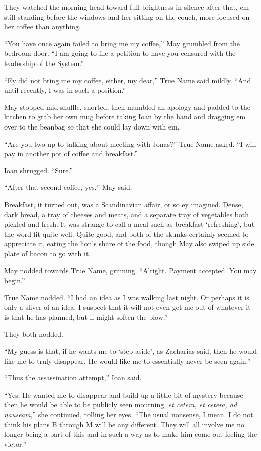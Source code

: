 They watched the morning head toward full brightness in silence after that, em still standing before the windows and her sitting on the couch, more focused on her coffee than anything.

``You have once again failed to bring me my coffee,'' May grumbled from the bedroom door. ``I am going to file a petition to have you censured with the leadership of the System.''

``Ey did not bring me my coffee, either, my dear,'' True Name said mildly. ``And until recently, I was in such a position.''

May stopped mid-shuffle, snorted, then mumbled an apology and padded to the kitchen to grab her own mug before taking Ioan by the hand and dragging em over to the beanbag so that she could lay down with em.

``Are you two up to talking about meeting with Jonas?'' True Name asked. ``I will pay in another pot of coffee and breakfast.''

Ioan shrugged. ``Sure.''

``After that second coffee, yes,'' May said.

Breakfast, it turned out, was a Scandinavian affair, or so ey imagined. Dense, dark bread, a tray of cheeses and meats, and a separate tray of vegetables both pickled and fresh. It was strange to call a meal such as breakfast `refreshing', but the word fit quite well. Quite good, and both of the skunks certainly seemed to appreciate it, eating the lion's share of the food, though May also swiped up side plate of bacon to go with it.

May nodded towards True Name, grinning. ``Alright. Payment accepted. You may begin.''

True Name nodded. ``I had an idea as I was walking last night. Or perhaps it is only a sliver of an idea. I suspect that it will not even get me out of whatever it is that he has planned, but if might soften the blow.''

They both nodded.

``My guess is that, if he wants me to `step aside', as Zacharias said, then he would like me to truly disappear. He would like me to essentially never be seen again.''

``Thus the assassination attempt,'' Ioan said.

``Yes. He wanted me to disappear and build up a little bit of mystery because then he would be able to be publicly seen mourning, \emph{et cetera, et cetera, ad nauseam},'' she continued, rolling her eyes. ``The usual nonsense, I mean. I do not think his plans B through M will be any different. They will all involve me no longer being a part of this and in such a way as to make him come out feeling the victor.''

